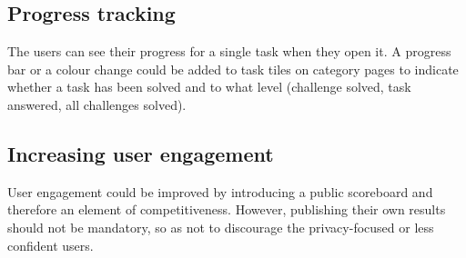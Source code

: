 \subsection{Progress tracking}

The users can see their progress for a single task when they open it. A progress bar or a colour change could be added to task tiles on category pages to indicate whether a task has been solved and to what level (challenge solved, task answered, all challenges solved).

\subsection{Increasing user engagement}

User engagement could be improved by introducing a public scoreboard and therefore an element of competitiveness. However, publishing their own results should not be mandatory, so as not to discourage the privacy-focused or less confident users.
